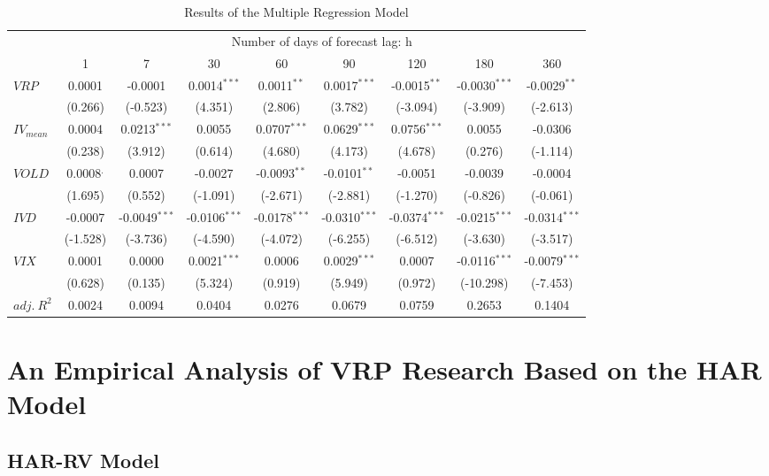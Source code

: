 \documentclass[a4paper, 12pt]{article}    %
\begin{document}
\begin{table}[htbp]
\centering
\footnotesize
\caption{Results of the Multiple Regression Model}
\label{tab:univariate_baseline_rotated}
\renewcommand{\arraystretch}{1.3}
\begin{tabular}{lcccccccc}
\toprule
 & \multicolumn{8}{c}{Number of days of forecast lag: h} \\
\cmidrule(lr){2-9}
 & 1    & 7    & 30   & 60   & 90   & 120  & 180  & 360 \\
\midrule
$VRP$         & 0.0001 & -0.0001 & 0.0014$^{***}$ & 0.0011$^{**}$ & 0.0017$^{***}$ & -0.0015$^{**}$ & -0.0030$^{***}$ & -0.0029$^{**}$ \\
              & (0.266) & (-0.523) & (4.351) & (2.806) & (3.782) & (-3.094) & (-3.909) & (-2.613) \\
$IV_{mean}$   & 0.0004 & 0.0213$^{***}$ & 0.0055 & 0.0707$^{***}$ & 0.0629$^{***}$ & 0.0756$^{***}$ & 0.0055 & -0.0306 \\
              & (0.238) & (3.912) & (0.614) & (4.680) & (4.173) & (4.678) & (0.276) & (-1.114) \\
$VOLD$        & 0.0008$^{.}$ & 0.0007 & -0.0027 & -0.0093$^{**}$ & -0.0101$^{**}$ & -0.0051 & -0.0039 & -0.0004 \\
              & (1.695) & (0.552) & (-1.091) & (-2.671) & (-2.881) & (-1.270) & (-0.826) & (-0.061) \\
$IVD$         & -0.0007 & -0.0049$^{***}$ & -0.0106$^{***}$ & -0.0178$^{***}$ & -0.0310$^{***}$ & -0.0374$^{***}$ & -0.0215$^{***}$ & -0.0314$^{***}$ \\
              & (-1.528) & (-3.736) & (-4.590) & (-4.072) & (-6.255) & (-6.512) & (-3.630) & (-3.517) \\
$VIX$         & 0.0001 & 0.0000 & 0.0021$^{***}$ & 0.0006 & 0.0029$^{***}$ & 0.0007 & -0.0116$^{***}$ & -0.0079$^{***}$ \\
              & (0.628) & (0.135) & (5.324) & (0.919) & (5.949) & (0.972) & (-10.298) & (-7.453) \\
\midrule
$adj.\ R^2$   & 0.0024 & 0.0094 & 0.0404 & 0.0276 & 0.0679 & 0.0759 & 0.2653 & 0.1404 \\
\bottomrule
\end{tabular}
\end{table}

\section{An Empirical Analysis of VRP Research Based on the HAR Model}
\subsection{HAR-RV Model}
\end{document}
